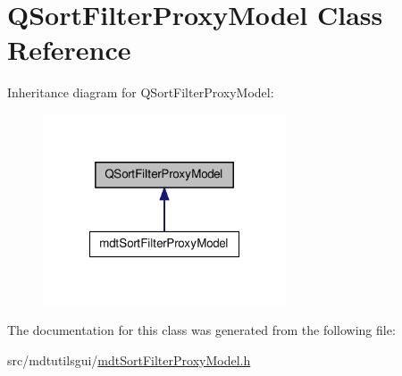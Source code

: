 \hypertarget{class_q_sort_filter_proxy_model}{\section{Q\-Sort\-Filter\-Proxy\-Model Class Reference}
\label{class_q_sort_filter_proxy_model}
}


Inheritance diagram for Q\-Sort\-Filter\-Proxy\-Model\-:
\nopagebreak
\begin{figure}[H]
\begin{center}
\leavevmode
\includegraphics[width=204pt]{class_q_sort_filter_proxy_model__inherit__graph}
\end{center}
\end{figure}


The documentation for this class was generated from the following file\-:\begin{DoxyCompactItemize}
\item 
src/mdtutilsgui/\hyperlink{mdt_sort_filter_proxy_model_8h}{mdt\-Sort\-Filter\-Proxy\-Model.\-h}\end{DoxyCompactItemize}
